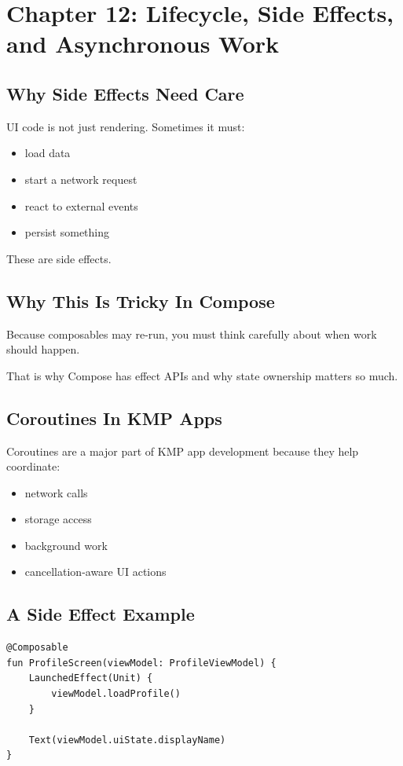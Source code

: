 \documentclass[11pt,a4paper]{article}
\begin{document}
\section{Chapter 12: Lifecycle, Side Effects, and Asynchronous Work}

\subsection{Why Side Effects Need Care}

UI code is not just rendering. Sometimes it must:
\begin{itemize}
    \item load data
    \item start a network request
    \item react to external events
    \item persist something
\end{itemize}

These are side effects.

\subsection{Why This Is Tricky In Compose}

Because composables may re-run, you must think carefully about when work should happen.

That is why Compose has effect APIs and why state ownership matters so much.

\subsection{Coroutines In KMP Apps}

Coroutines are a major part of KMP app development because they help coordinate:
\begin{itemize}
    \item network calls
    \item storage access
    \item background work
    \item cancellation-aware UI actions
\end{itemize}

\subsection{A Side Effect Example}

\begin{lstlisting}[style=kazekotlin]
@Composable
fun ProfileScreen(viewModel: ProfileViewModel) {
    LaunchedEffect(Unit) {
        viewModel.loadProfile()
    }

    Text(viewModel.uiState.displayName)
}
\end{lstlisting}
\end{document}
